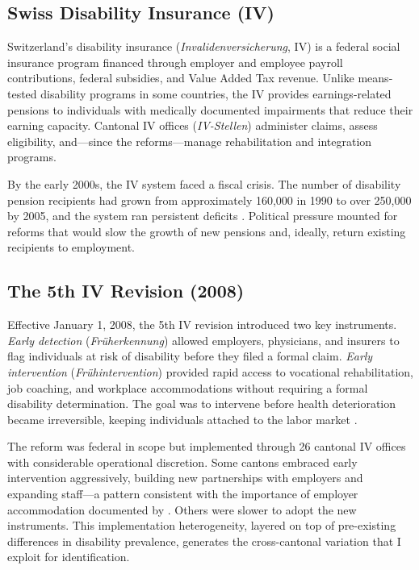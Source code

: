 \documentclass[12pt]{article}
\begin{document}
\subsection{Swiss Disability Insurance (IV)}

Switzerland's disability insurance (\textit{Invalidenversicherung}, IV) is a federal social insurance program financed through employer and employee payroll contributions, federal subsidies, and Value Added Tax revenue. Unlike means-tested disability programs in some countries, the IV provides earnings-related pensions to individuals with medically documented impairments that reduce their earning capacity. Cantonal IV offices (\textit{IV-Stellen}) administer claims, assess eligibility, and---since the reforms---manage rehabilitation and integration programs.

By the early 2000s, the IV system faced a fiscal crisis. The number of disability pension recipients had grown from approximately 160,000 in 1990 to over 250,000 by 2005, and the system ran persistent deficits \citep{bsv2021ivstatistik}. Political pressure mounted for reforms that would slow the growth of new pensions and, ideally, return existing recipients to employment.

\subsection{The 5th IV Revision (2008)}

Effective January 1, 2008, the 5th IV revision introduced two key instruments. \emph{Early detection} (\textit{Fr\"{u}herkennung}) allowed employers, physicians, and insurers to flag individuals at risk of disability before they filed a formal claim. \emph{Early intervention} (\textit{Fr\"{u}hintervention}) provided rapid access to vocational rehabilitation, job coaching, and workplace accommodations without requiring a formal disability determination. The goal was to intervene before health deterioration became irreversible, keeping individuals attached to the labor market \citep{bsv2012evaluation5}.

The reform was federal in scope but implemented through 26 cantonal IV offices with considerable operational discretion. Some cantons embraced early intervention aggressively, building new partnerships with employers and expanding staff---a pattern consistent with the importance of employer accommodation documented by \citet{fevang2017disability}. Others were slower to adopt the new instruments. This implementation heterogeneity, layered on top of pre-existing differences in disability prevalence, generates the cross-cantonal variation that I exploit for identification.
\end{document}
